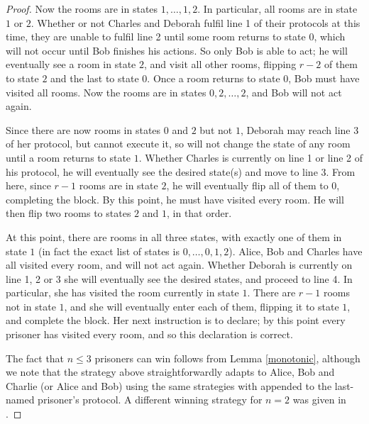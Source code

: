 \documentclass[a4paper,11pt]{extarticle}
\theoremstyle{definition}
\theoremstyle{remark}
\begin{document}
\begin{proof}
		Now the rooms are in states $1,\ldots,1,2$. In particular, all rooms are in state $1$ or $2$.   Whether or not Charles and Deborah fulfil line 1 of their protocols at this time, they are unable to fulfil line 2 until some room returns to state $0$, which will not occur until Bob finishes his actions. So only Bob is able to act; he will eventually see a room in state $2$, and visit all other rooms, flipping $r-2$ of them to state $2$ and the last to state $0$. Once a room returns to state $0$, Bob must have visited all rooms. Now the rooms are in states $0,2,\ldots,2$, and Bob will not act again.
		
		Since there are now rooms in states $0$ and $2$ but not $1$, Deborah may reach line 3 of her protocol, but cannot execute it, so will not change the state of any room until a room returns to state $1$. Whether Charles is currently on line 1 or line 2 of his protocol, he will eventually see the desired state(s) and move to line 3. From here, since $r-1$ rooms are in state $2$, he will eventually flip all of them to $0$, completing the \rpttext block. By this point, he must have visited every room. He will then flip two rooms to states $2$ and $1$, in that order.
		
		At this point, there are rooms in all three states, with exactly one of them in state $1$ (in fact the exact list of states is $0,\ldots,0,1,2$). Alice, Bob and Charles have all visited every room, and will not act again. Whether Deborah is currently on line 1, 2 or 3 she will eventually see the desired states, and proceed to line 4. In particular, she has visited the room currently in state $1$. There are $r-1$ rooms not in state $1$, and she will eventually enter each of them, flipping it to state $1$, and complete the \rpttext block. Her next instruction is to declare; by this point every prisoner has visited every room, and so this declaration is correct.
		
		
		The fact that $n\leq 3$ prisoners can win follows from Lemma \ref{monotonic}, although we note that the strategy above straightforwardly adapts to Alice, Bob and Charlie (or Alice and Bob) using the same strategies with \dec appended to the last-named prisoner's protocol. A different winning strategy for $n=2$ was given in \cite{KK21}.
	\end{proof}
	
\end{document}
